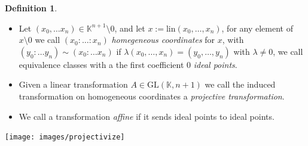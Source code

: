 \documentclass[9pt]{beamer}
\theoremstyle{definition}
\newtheorem{defn}{Definition}
\begin{document}
\begin{frame}[fragile]{}
  \begin{defn}
    \begin{itemize}
    \item Let $(x_0, \dots x_n) \in \mathbb{K}^{n+1} \setminus 0$, and let $x := \text{lin}{(x_0, \dots, x_n)}$,
      for any element of $x \setminus 0$ we call $(x_0: \dots :x_n)$ \emph{homegeneous coordinates} for $x$,
      with $(y_0: \dots y_n) \sim (x_0: \dots x_n)$ if $\lambda (x_0, \dots, x_n) = (y_0, \dots, y_n)$ with $\lambda \neq 0$, we call equivalence classes with a the first coefficient $0$ \emph{ideal points}.
    \item Given a linear transformation $A \in \text{GL}(\mathbb{K}, n+1)$ we call the induced transformation on homogeneous coordinates a \emph{projective transformation}.
    \item We call a transformation \emph{affine} if it sends ideal points to ideal points.
    \end{itemize}
  \end{defn}
  \begin{center}
    \texttt{[image: images/projectivize]}
  \end{center}

\end{frame}
\end{document}

